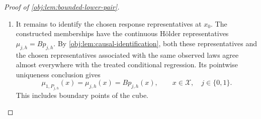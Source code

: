\begin{proof}[Proof of \cref{obj:lem:bounded-lower-pair}]
\begin{enumerate}
Both observed laws are obtained by integrating \(\mathsf Q_{j,x}\)
against the same uniform covariate law, and each conditional law
records its covariate \(x\) in the first coordinate. The entropy
disintegration identity therefore gives
\[
\operatorname{KL}(P_{0,h},P_{1,h})
=
\int_{\mathcal X}
\operatorname{KL}(\mathsf Q_{0,x},\mathsf Q_{1,x})\,dx.
\]
On \(E_h\), apply the conditional entropy and propensity bounds; on
its complement, the integrand is zero. Consequently,
\[
\begin{aligned}
\operatorname{KL}(P_{0,h},P_{1,h})
&\le
\frac{2}{\theta_0}(ah^\beta)^2
\bigl((2h)^d\bigr)^{1/(\gamma-1)}
\operatorname{vol}(E_h\cap\mathcal X)\\
&\le
\frac{2}{\theta_0}(ah^\beta)^2
\bigl((2h)^d\bigr)^{1/(\gamma-1)}(2h)^d\\
&=
\frac{2}{\theta_0}\,2^{D_\gamma}a^2h^{2\beta+D_\gamma}
=K_{\mathrm{KL}}a^2h^{\tau_{\mathrm{KL}}}.
\end{aligned}
\]
The last equality uses
\[
\frac{d}{\gamma-1}+d=D_\gamma.
\]
The finite entropy bound supplies both
\[
P_{0,h}\ll P_{1,h},
\qquad
\int
\left|\log\frac{dP_{0,h}}{dP_{1,h}}\right|\,dP_{0,h}<\infty.
\]

Finally, the oracle mesh satisfies
\[
h_{\gamma,n}^{\tau_{\mathrm{KL}}}=n^{-1},
\qquad
nh^{\tau_{\mathrm{KL}}}
=n(ch_{\gamma,n})^{\tau_{\mathrm{KL}}}
=c^{\tau_{\mathrm{KL}}}.
\]
The fixed calibration from the second step therefore gives
\[
n\operatorname{KL}(P_{0,h},P_{1,h})
\le K_{\mathrm{KL}}a^2c^{\tau_{\mathrm{KL}}}
\le\frac18.
\]

\item It remains to identify the chosen response representatives at
\(x_0\). The constructed memberships have the continuous Hölder
representatives \(\mu_{j,h}=Bp_{j,h}\). By
\cref{obj:lem:causal-identification}, both these representatives and the
chosen representatives associated with the same observed laws agree
almost everywhere with the treated conditional regression. Its
pointwise uniqueness conclusion gives
\[
\mu_{1,P_{j,h}}(x)=\mu_{j,h}(x)=Bp_{j,h}(x),
\qquad x\in\mathcal X,\quad j\in\{0,1\}.
\]
This includes boundary points of the cube.


\end{enumerate}
\end{proof}
